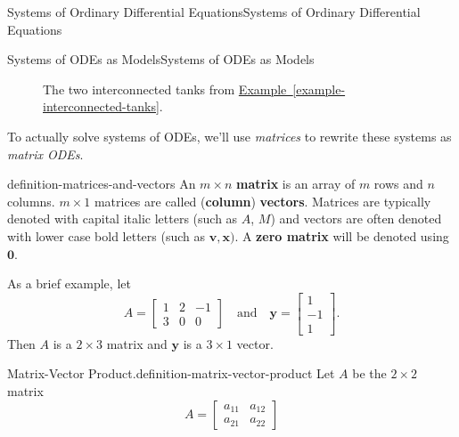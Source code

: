 \documentclass[10pt,]{book}
\newcommand{\terminology}[1]{\textbf{#1}}
\numberwithin{equation}{section}
\renewcommand{\vec}[1]{\mathbf{#1}}
\newcommand{\amp}{&}
\begin{document}
\begin{chapterptx}{Systems of Ordinary Differential Equations}{}{Systems of Ordinary Differential Equations}{}{}
\begin{sectionptx}{Systems of ODEs as Models}{}{Systems of ODEs as Models}{}{}
\begin{figure}
{
}
\caption{The two interconnected tanks from \hyperref[example-interconnected-tanks]{Example~\ref{example-interconnected-tanks}}.\label{figure-interconnected-tanks}}
\end{figure}
\hypertarget{p-303}{}%
To actually solve systems of ODEs, we'll use \emph{matrices} to rewrite these systems as \emph{matrix ODEs}.%
\begin{definition}{}{definition-matrices-and-vectors}%
\hypertarget{p-304}{}%
An \(m\times n\) \terminology{matrix} is an array of \(m\) rows and \(n\) columns. \(m\times1\) matrices are called (\terminology{column}) \terminology{vectors}. Matrices are typically denoted with capital italic letters (such as \(A\), \(M\)) and vectors are often denoted with lower case bold letters (such as \(\vec{v},\vec{x})\). A \terminology{zero matrix} will be denoted using \(\vec{0}\).%
\end{definition}
\hypertarget{p-305}{}%
As a brief example, let%
\begin{equation*}
A = \begin{bmatrix} 1\amp2\amp-1\\3\amp0\amp0\end{bmatrix}\quad\text{and}\quad \vec{y} = \begin{bmatrix} 1\\-1\\1 \end{bmatrix}.
\end{equation*}
Then \(A\) is a \(2\times3\) matrix and \(\vec{y}\) is a \(3\times 1\) vector.%
\begin{definition}{Matrix-Vector Product.}{definition-matrix-vector-product}%
\hypertarget{p-306}{}%
Let \(A\) be the \(2\times 2\) matrix%
\begin{equation*}
A = \begin{bmatrix} a_{11}\amp a_{12}\\a_{21}\amp a_{22} \end{bmatrix}
\end{equation*}

\end{definition}
\end{sectionptx}
\end{chapterptx}
\end{document}
